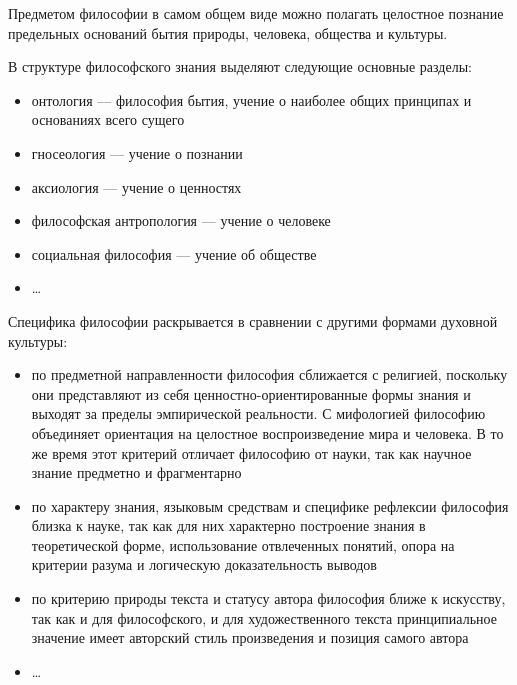 Предметом философии в самом общем виде можно полагать целостное познание предельных оснований бытия природы, человека, общества и культуры.

В структуре философского знания выделяют следующие основные разделы:
\begin{itemize}
	\item онтология --- философия бытия, учение о наиболее общих принципах и основаниях всего сущего
	\item гносеология --- учение о познании
	\item аксиология --- учение о ценностях
	\item философская антропология --- учение о человеке
	\item социальная философия --- учение об обществе
	\item \ldots
\end{itemize}

Специфика философии раскрывается в сравнении с другими формами духовной культуры:
\begin{itemize}
	\item по предметной направленности философия сближается с религией, поскольку они представляют из себя ценностно-ориентированные формы знания и выходят за пределы эмпирической реальности. С мифологией философию объединяет ориентация на целостное воспроизведение мира и человека. В то же время этот критерий отличает философию от науки, так как научное знание предметно и фрагментарно
	\item по характеру знания, языковым средствам и специфике рефлексии философия близка к науке, так как для них характерно построение знания в теоретической форме, использование отвлеченных понятий, опора на критерии разума и логическую доказательность выводов
	\item по критерию природы текста и статусу автора философия ближе к искусству, так как и для философского, и для художественного текста принципиальное значение имеет авторский стиль произведения и позиция самого автора
	\item \ldots
\end{itemize}